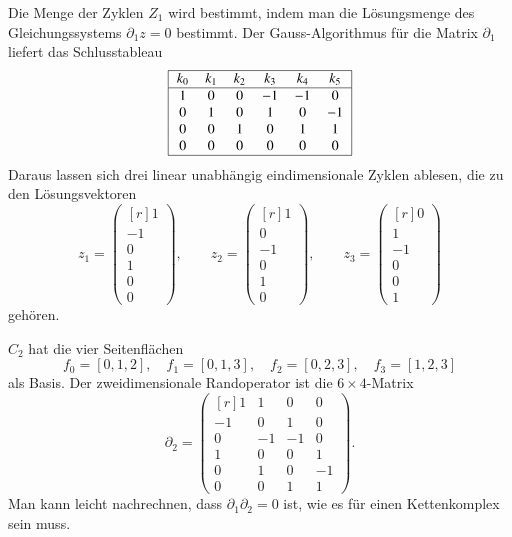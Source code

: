 \begin{beispiel}
Die Menge der Zyklen $Z_1$ wird bestimmt, indem man die Lösungsmenge
des Gleichungssystems $\partial_1z=0$ bestimmt.
Der Gauss-Algorithmus für die Matrix $\partial_1$ liefert das
Schlusstableau
\[
\begin{tabular}{|>{$}c<{$}>{$}c<{$}>{$}c<{$}>{$}c<{$}>{$}c<{$}>{$}c<{$}|}
\hline
k_0&k_1&k_2&k_3&k_4&k_5\\
\hline
   1&  0&  0& -1& -1&  0\\
   0&  1&  0&  1&  0& -1\\
   0&  0&  1&  0&  1&  1\\
   0&  0&  0&  0&  0&  0\\
\hline
\end{tabular}
\]
Daraus lassen sich drei linear unabhängig eindimensionale Zyklen ablesen,
die zu den Lösungsvektoren
\[
z_1
=
\begin{pmatrix*}[r]
1\\
-1\\
0\\
1\\
0\\
0
\end{pmatrix*},
\qquad
z_2
=
\begin{pmatrix*}[r]
1\\
0\\
-1\\
0\\
1\\
0
\end{pmatrix*},
\qquad
z_3
=
\begin{pmatrix*}[r]
0\\
1\\
-1\\
0\\
0\\
1
\end{pmatrix*}
\]
gehören.

$C_2$ hat die vier Seitenflächen
\[
f_0=[0,1,2],\quad
f_1=[0,1,3],\quad
f_2=[0,2,3],\quad
f_3=[1,2,3]
\]
als Basis.
Der zweidimensionale Randoperator ist die $6\times 4$-Matrix 
\[
\partial_2
=
\begin{pmatrix*}[r]
 1& 1& 0& 0\\
-1& 0& 1& 0\\
 0&-1&-1& 0\\
 1& 0& 0& 1\\
 0& 1& 0&-1\\
 0& 0& 1& 1
\end{pmatrix*}.
\]
Man kann leicht nachrechnen, dass $\partial_1\partial_2=0$ ist, wie es
für einen Kettenkomplex sein muss.


\end{beispiel}
